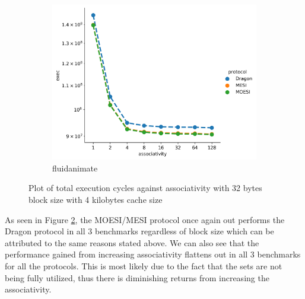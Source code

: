 \documentclass[nonacm,acmsmall,screen,11pt]{acmart}
\begin{document}
\begin{figure}[htb!]
\begin{subfigure}{0.32\textwidth}
    \label{fig:associativity:bodytrack}
  \end{subfigure}
  \begin{subfigure}{0.32\textwidth}
    \includegraphics[width=\columnwidth]{associativity-fluidanimate}
    \caption{fluidanimate}
  \end{subfigure}
  \caption{Plot of total execution cycles against associativity with 32 bytes block size with 4 kilobytes cache size}
  \label{fig:associativity}
\end{figure}

As seen in Figure \ref{fig:associativity}, the MOESI/MESI protocol once again out performs the Dragon protocol in all 3 benchmarks regardless of block size which can be attributed to the same reasons stated above. We can also see that the performance gained from increasing associativity flattens out in all 3 benchmarks for all the protocols. This is most likely due to the fact that the sets are not being fully utilized, thus there is diminishing returns from increasing the associativity.
\end{document}
